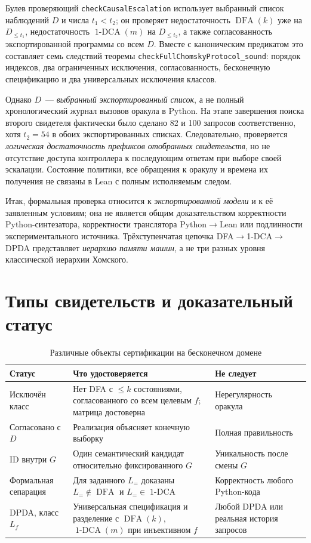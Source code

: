 \documentclass[11pt,a4paper]{article}
\newcommand{\DFA}{\operatorname{DFA}}
\newcommand{\oneDCA}{\operatorname{1\text{-}DCA}}
\begin{document}
Булев проверяющий \texttt{checkCausalEscalation} использует выбранный список наблюдений $D$ и числа $t_1<t_2$; он проверяет недостаточность $\DFA(k)$ уже на $D_{\le t_1}$, недостаточность $\oneDCA(m)$ на $D_{\le t_2}$, а также согласованность экспортированной программы со всем $D$. Вместе с каноническим предикатом это составляет семь следствий теоремы \texttt{checkFullChomskyProtocol\_sound}: порядок индексов, два ограниченных исключения, согласованность, бесконечную спецификацию и два универсальных исключения классов.

Однако $D$~--- \emph{выбранный экспортированный список}, а не полный хронологический журнал вызовов оракула в Python. На этапе завершения поиска второго свидетеля фактически было сделано 82 и 100 запросов соответственно, хотя $t_2=54$ в обоих экспортированных списках. Следовательно, проверяется \emph{логическая достаточность префиксов отобранных свидетельств}, но не отсутствие доступа контроллера к последующим ответам при выборе своей эскалации. Состояние политики, все обращения к оракулу и времена их получения не связаны в Lean с полным исполняемым следом.

Итак, формальная проверка относится к \emph{экспортированной модели} и к её заявленным условиям; она не является общим доказательством корректности Python-синтезатора, корректности транслятора Python$\to$Lean или подлинности экспериментального источника. Трёхступенчатая цепочка DFA$\to$1-DCA$\to$DPDA представляет \emph{иерархию памяти машин}, а не три разных уровня классической иерархии Хомского.

\section{Типы свидетельств и доказательный статус}

\begin{table}[htbp]
\centering\small
\caption{Различные объекты сертификации на бесконечном домене}\label{tab:status}
\renewcommand{\arraystretch}{1.12}
\begin{tabularx}{\linewidth}{@{}>{\raggedright\arraybackslash}p{2.55cm}>{\raggedright\arraybackslash}X>{\raggedright\arraybackslash}p{3.05cm}@{}}
\toprule
\textbf{Статус} & \textbf{Что удостоверяется} & \textbf{Не следует}\\
\midrule
Исключён класс & Нет DFA с $\le k$ состояниями, согласованного со всем целевым $f$; матрица достоверна & Нерегулярность оракула\\
Согласовано с $D$ & Реализация объясняет конечную выборку & Полная правильность\\
ID внутри $G$ & Один семантический кандидат относительно фиксированного $G$ & Уникальность после смены $G$\\
Формальная сепарация & Для заданного $L_=$ доказаны $L_=\notin\DFA$ и $L_=\in\oneDCA$ & Корректность любого Python-кода\\
DPDA, класс $L_f$ & Универсальная спецификация и разделение с $\DFA(k)$, $\oneDCA(m)$ при инъективном $f$ & Любой DPDA или реальная история запросов\\
\bottomrule
\end{tabularx}
\end{table}
\end{document}
